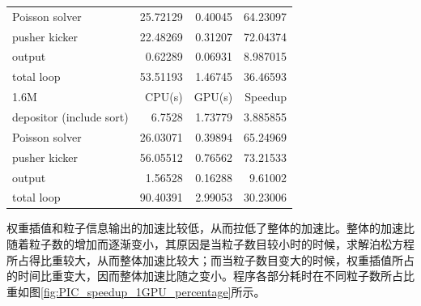 \begin{table}
\begin{tabular}{|l|r|r|r|}
    Poisson solver           &    25.72129    &     0.40045   &  64.23097   \\
    pusher kicker            &    22.48269	  &     0.31207	  &  72.04374   \\
    output                   &    0.62289     &     0.06931   &  8.987015   \\
    total loop               &    53.51193    &     1.46745   &  36.46593   \\
    \hline
    1.6M                     &    CPU(s)      &     GPU(s)    &  Speedup    \\
    \hline
    depositor (include sort) &    6.7528      &     1.73779   &  3.885855   \\
    Poisson solver           &    26.03071    &     0.39894   &  65.24969   \\
    pusher kicker            &    56.05512	  &     0.76562	  &  73.21533   \\
    output                   &    1.56528     &     0.16288   &  9.61002    \\
    total loop               &    90.40391    &     2.99053   &  30.23006   \\
    \hline
  \end{tabular}
  \label{tab:PIC_speedup_1GPU}
\end{table}

权重插值和粒子信息输出的加速比较低，从而拉低了整体的加速比。整体的加速比随着粒子数的增加而逐渐变小，其原因是当粒子数目较小时的时候，求解泊松方程所占得比重较大，从而整体加速比较大；而当粒子数目变大的时候，权重插值所占的时间比重变大，因而整体加速比随之变小。程序各部分耗时在不同粒子数所占比重如图\ref{fig:PIC_speedup_1GPU_percentage}所示。

